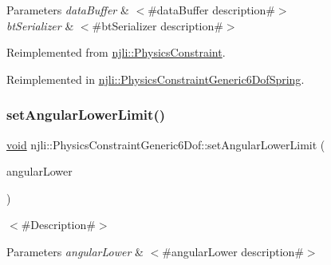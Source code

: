 \begin{DoxyParams}{Parameters}
{\em data\+Buffer} & $<$\#data\+Buffer description\#$>$ \\
\hline
{\em bt\+Serializer} & $<$\#bt\+Serializer description\#$>$ \\
\hline
\end{DoxyParams}


Reimplemented from \mbox{\hyperlink{classnjli_1_1_physics_constraint_ae294d089963246a8e65b41913730efb1}{njli\+::\+Physics\+Constraint}}.



Reimplemented in \mbox{\hyperlink{classnjli_1_1_physics_constraint_generic6_dof_spring_a8d00ec82407e32449b1e9016c13ca301}{njli\+::\+Physics\+Constraint\+Generic6\+Dof\+Spring}}.

\mbox{\label{classnjli_1_1_physics_constraint_generic6_dof_ae30482945c39ae7b4fff65eb1e11c804}} 
\subsubsection{\texorpdfstring{set\+Angular\+Lower\+Limit()}{setAngularLowerLimit()}}
{\footnotesize\ttfamily \mbox{\hyperlink{_thread_8h_af1e856da2e658414cb2456cb6f7ebc66}{void}} njli\+::\+Physics\+Constraint\+Generic6\+Dof\+::set\+Angular\+Lower\+Limit (\begin{DoxyParamCaption}\item[{const bt\+Vector3 \&}]{angular\+Lower }\end{DoxyParamCaption})}

$<$\#\+Description\#$>$


\begin{DoxyParams}{Parameters}
{\em angular\+Lower} & $<$\#angular\+Lower description\#$>$ \\
\hline
\end{DoxyParams}
\mbox{\label{classnjli_1_1_physics_constraint_generic6_dof_a09328e27ff0e4f5bf3c5f4fc399b5176}} 

